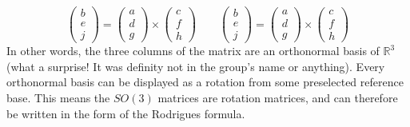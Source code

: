 \documentclass{article}
\newcommand{\R}{\ensuremath{\mathbb{R}}}
\begin{document}
\begin{equation}
    \begin{pmatrix} b \\ e \\ j \end{pmatrix} =
    \begin{pmatrix} a \\ d \\ g \end{pmatrix}
    \times
    \begin{pmatrix} c \\ f \\ h \end{pmatrix}
    \qquad
    \begin{pmatrix} b \\ e \\ j \end{pmatrix} =
    \begin{pmatrix} a \\ d \\ g \end{pmatrix}
    \times
    \begin{pmatrix} c \\ f \\ h \end{pmatrix}
\end{equation}
In other words, the three columns of the matrix are an orthonormal basis of $\R^3$ (what a surprise! It was definity not in the group's name or anything). Every orthonormal basis can be displayed as a rotation from some preselected reference base. This means the $SO(3)$ matrices are rotation matrices, and can therefore be written in the form of the Rodrigues formula.
\end{document}
